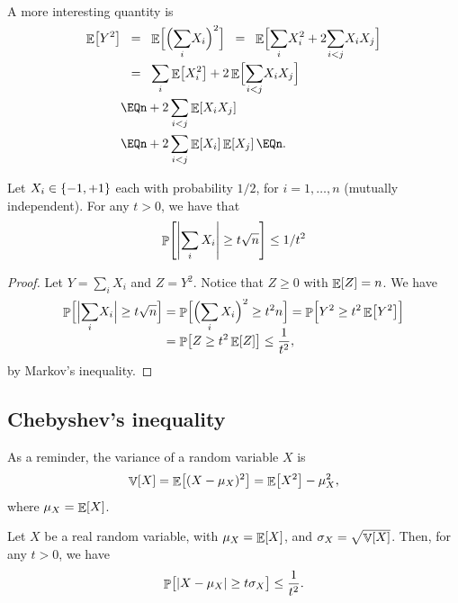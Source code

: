 A more interesting quantity is
\begin{align*}
  \Ex{Y^2} %
  &\EQ%
    \Ex{ \smash{\Bigl(\smash{\sum_i} X_i\Bigr)^2} \Bigr.}%
    \EQ%
    \Ex{\Bigl. \smash{\sum_i} X_i^2 + 2 \smash{\sum_{i < j}} X_i X_j}%
    \\[.2cm]&
    \EQ%
    \sum_i \Ex{  X_i^2} + 2\Ex{  \smash{\sum_{i < j}} X_i X_j \Bigr.}%
    \\&
    \EQ%
    n  + 2 \sum_{i < j} \Ex{ X_i X_j}%
  \\&%
  \EQ%
  n + 2 \sum_{i < j} \Ex{ X_i} \Ex{ X_j}%
  \EQ%
  n.
\end{align*}

\begin{lemma}
    Let $X_i \in \left\{ {-1,+1} \right\}$ each with probability $1/2$, for
    $i=1,\ldots, n$ (mutually independent). For any $t > 0$, we have that
    \begin{equation*}
        \Prob{ \cardin{\sum_i X_i} \geq t \sqrt{n}} \leq 1/t^2
    \end{equation*}
\end{lemma}

\begin{proof}
    Let $Y= \sum_i X_i$ and $Z =Y^2$. Notice that $Z \geq 0$ with
    $\mathop{\mathbb{E}}\!\left[ {Z} \right] = n$.  We have
    \begin{align*}
        \Prob{ \cardin{\Bigl.\smash{\sum_i} X_i} \geq t \sqrt{n}}%
        &=%
        \Prob{ \smash{ \Bigl(\sum_i X_i\Bigr)^2 \geq t^2 n} \Bigr.}%
        =%
        \Prob{ Y^2 \geq t^2 \Ex{Y^2} \Bigr.} %
        \\&=%
        \Prob{ Z \geq t^2 \Ex{Z}} %
        \leq%
        \frac{1}{t^2},
    \end{align*}
    by Markov's inequality.
\end{proof}


\subsection{Chebyshev's inequality}

As a reminder, the variance of a random variable $X$ is
\begin{equation*}
    \mathop{\mathbb{V}}\!\left[ { X} \right] = \mathop{\mathbb{E}}\!\left[ { (X -\mu_X)^2 } \right] = \mathop{\mathbb{E}}\!\left[ {X^2} \right] - \mu_X^2,
\end{equation*}
where $\mu_X = \mathop{\mathbb{E}}\!\left[ {X} \right]$.




\begin{fragment}{}
    \begin{theorem}
        Let $X$ be a real random variable, with $\mu_X = \mathop{\mathbb{E}}\!\left[ {X} \right]$, and
        $\sigma_X = \sqrt{\mathop{\mathbb{V}}\!\left[ {X} \right]}$. Then, for any $t > 0$, we have
        \begin{equation*}
            \Prob{\bigl. \cardin{X - \mu_X} \geq t \sigma_X} \leq
            \frac{1}{t^2}.
        \end{equation*}
    \end{theorem}
\end{fragment}


